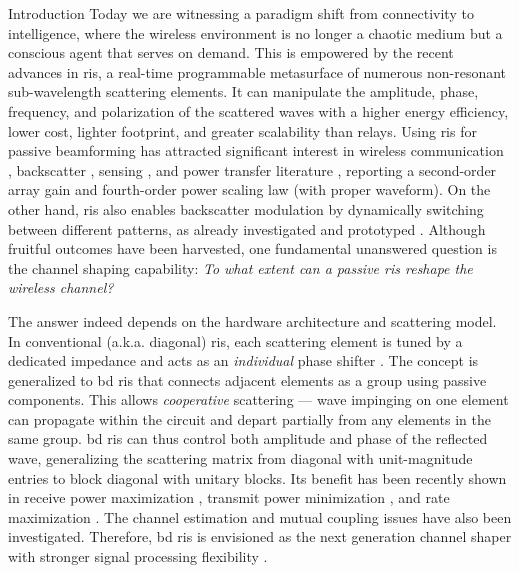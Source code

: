 \documentclass[journal]{IEEEtran}
\begin{document}
\begin{section}{Introduction}
	Today we are witnessing a paradigm shift from connectivity to intelligence, where the wireless environment is no longer a chaotic medium but a conscious agent that serves on demand.
	This is empowered by the recent advances in \gls{ris}, a real-time programmable metasurface of numerous non-resonant sub-wavelength scattering elements.
	It can manipulate the amplitude, phase, frequency, and polarization of the scattered waves \cite{Basar2019} with a higher energy efficiency, lower cost, lighter footprint, and greater scalability than relays.
	Using \gls{ris} for {passive beamforming} has attracted significant interest in wireless communication \cite{Wu2019,Wu2020c,Yang2020,Zheng2021}, backscatter \cite{Jia2020,Liang2022}, sensing \cite{Liu2022a,Hua2023}, and power transfer literature \cite{Wu2021d,Feng2022,Zhao2022}, reporting a second-order array gain and fourth-order power scaling law (with proper waveform).
	On the other hand, \gls{ris} also enables {backscatter modulation} by dynamically switching between different patterns, as already investigated \cite{Karasik2020,Basar2020,Zhao2022a} and prototyped \cite{Tang2019a,Dai2020a}.
	Although fruitful outcomes have been harvested, one fundamental unanswered question is the {channel shaping} capability: \emph{To what extent can a passive \gls{ris} reshape the wireless channel?}

	The answer indeed depends on the hardware architecture and scattering model.
	In conventional (a.k.a. diagonal) \gls{ris}, each scattering element is tuned by a dedicated impedance and acts as an \emph{individual} phase shifter \cite{Wu2020}.
	The concept is generalized to \gls{bd} \gls{ris} \cite{Shen2020a,Li2023b} that connects adjacent elements as a group using passive components.
	This allows \emph{cooperative} scattering --- wave impinging on one element can propagate within the circuit and depart partially from any elements in the same group.
	\gls{bd} \gls{ris} can thus control both amplitude and phase of the reflected wave, generalizing the scattering matrix from diagonal with unit-magnitude entries to block diagonal with  unitary blocks.
	Its benefit has been recently shown in receive power maximization \cite{Nerini2023,Santamaria2023,Fang2023,Nerini2023a}, transmit power minimization \cite{Zhou2023}, and rate maximization \cite{Zhou2023,Nerini2023a,Li2023d,Bartoli2023,Li2023c}.
	The channel estimation \cite{Li2023e} and mutual coupling \cite{Li2023f} issues have also been investigated.
	Therefore, \gls{bd} \gls{ris} is envisioned as the next generation channel shaper with stronger signal processing flexibility \cite{Li2023g}.


\end{section}
\end{document}
